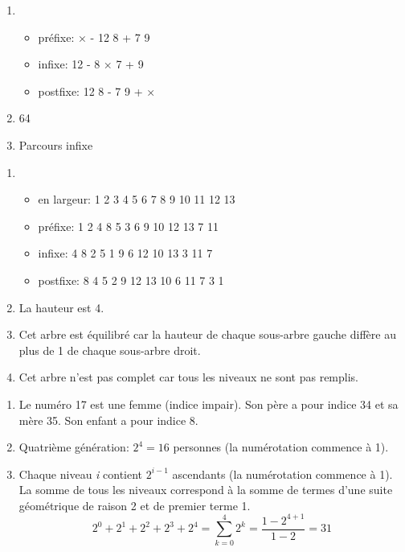 \documentclass[a4paper,11pt]{article}
\begin{document}
\begin{Form}
    \begin{exo}
        \begin{enumerate}
            \item \begin{itemize}
                      \item préfixe: × - 12 8 + 7 9
                      \item infixe: 12 - 8 × 7 + 9
                      \item postfixe: 12 8 - 7 9 + ×
                  \end{itemize}
            \item 64
            \item Parcours infixe
        \end{enumerate}
    \end{exo}
    \begin{exo}
        \begin{enumerate}
            \item
                  \begin{itemize}
                      \item en largeur: 1 2 3 4 5 6 7 8 9 10 11 12 13
                      \item préfixe: 1 2 4 8 5 3 6 9 10 12 13 7 11
                      \item infixe: 4 8 2 5 1 9 6 12 10 13 3 11 7
                      \item postfixe: 8 4 5 2 9 12 13 10 6 11 7 3 1
                  \end{itemize}
            \item La hauteur est 4.
            \item Cet arbre est équilibré car la hauteur de chaque sous-arbre gauche diffère au plus de 1 de chaque sous-arbre droit.
            \item Cet arbre n'est pas complet car tous les niveaux ne sont pas remplis.
        \end{enumerate}
    \end{exo}
    \begin{exo}
        \begin{enumerate}
            \item Le numéro 17 est une femme (indice impair). Son père a pour indice 34 et sa mère 35. Son enfant a pour indice 8.
            \item Quatrième génération: $2^4 = 16$ personnes (la numérotation commence à 1).
            \item Chaque niveau \emph{i} contient $2^{i-1}$ ascendants (la numérotation commence à 1). La somme de tous les niveaux correspond à la somme de termes d'une suite géométrique de raison 2 et de premier terme 1. $$2^0+2^1+2^2+2^3+2^4=\sum_{k=0}^{4}{2^k}=\dfrac{1-2^{4+1}}{1-2}=31$$

\end{enumerate}
\end{exo}
\end{Form}
\end{document}
